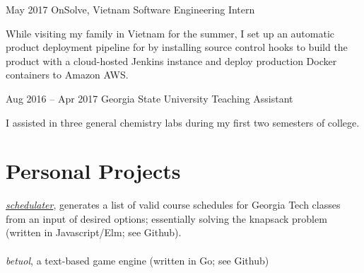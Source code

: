 \documentclass{tccv}
\begin{document}
\begin{minipage}[t]{0.65\textwidth}
\begin{eventlist}
\item{May 2017}
     {OnSolve, Vietnam}
     {Software Engineering Intern}

    While visiting my family in Vietnam for the summer, I set up an automatic product deployment pipeline for by installing source control hooks to build the product with a cloud-hosted Jenkins instance and deploy production Docker containers to Amazon AWS.

\item{Aug 2016 -- Apr 2017}
     {Georgia State University}
     {Teaching Assistant}

    I assisted in three general chemistry labs during my first two semesters of college.

\section{Personal Projects}

\href{https://stnma7e.github.io/schedulater}{\emph{schedulater}}, generates a list of valid course schedules for Georgia Tech classes from an input of desired options; essentially solving the knapsack problem (written in Javascript/Elm; see Github). 
\\ \\
\emph{betuol}, a text-based game engine (written in Go; see Github)

\end{eventlist}
\end{minipage}
\end{document}
